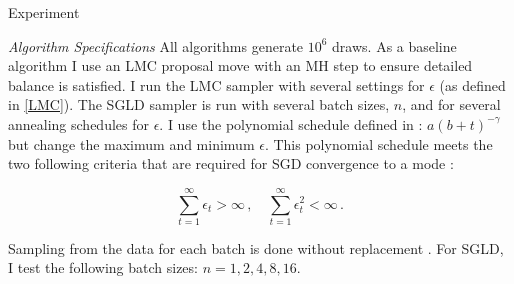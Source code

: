 \documentclass{article}
\begin{document}
\begin{section}{Experiment}
\begin{subsection}{\it Algorithm Specifications}
All algorithms generate $10^6$ draws.  As a baseline algorithm I use an LMC proposal move with an MH step to ensure detailed balance is satisfied.  I run the LMC sampler with several settings for $\epsilon$ (as defined in \eqref{LMC}).  The SGLD sampler is run with several batch sizes, $n$, and for several annealing schedules for $\epsilon$.  I use the polynomial schedule defined in \cite{WelTeh2011a}: $a(b+t)^{-\gamma}$ but change the maximum and minimum $\epsilon$.  This polynomial schedule meets the two following criteria that are required for SGD convergence to a mode \cite{Bottou10}:

$$ \sum_{t=1}^{\infty} \epsilon_t > \infty\,,\quad \sum_{t=1}^{\infty}\epsilon_t^2 < \infty\,.$$

Sampling from the data for each batch is done without replacement \cite{Niu11}.  For SGLD, I test the following batch sizes: $n = 1,2,4,8,16$.
\end{subsection}
\end{section}
\end{document}
